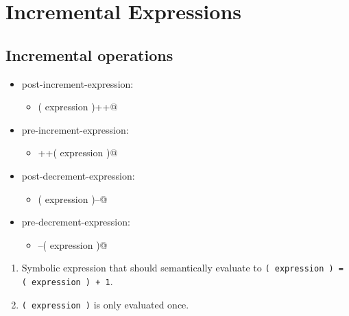 \section{Incremental Expressions}

\subsection{Incremental operations}
\begin{itemize}[before=\itshape, label={}]
	\item post-increment-expression:
	\begin{itemize}[before=\itshape, label={}]
		\item \lstinline@( expression )++@
	\end{itemize}
	\item pre-increment-expression:
	\begin{itemize}[before=\itshape, label={}]
		\item \lstinline@++( expression )@
	\end{itemize}
	\item post-decrement-expression:
	\begin{itemize}[before=\itshape, label={}]
		\item \lstinline@( expression )--@
	\end{itemize}
	\item pre-decrement-expression:
	\begin{itemize}[before=\itshape, label={}]
		\item \lstinline@--( expression )@
	\end{itemize}
\end{itemize}
\begin{enumerate}
	\item Symbolic expression that should semantically evaluate to \lstinline|( expression ) = ( expression ) + 1|.
	\item \lstinline|( expression )| is only evaluated once.
\end{enumerate}
